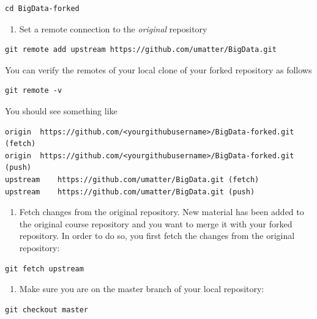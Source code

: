 \documentclass[
  12pt,
]{style/krantz}
\providecommand{\tightlist}{%
  \setlength{\itemsep}{0pt}\setlength{\parskip}{0pt}}
\begin{document}
\begin{verbatim}
cd BigData-forked
\end{verbatim}

\begin{enumerate}
\def\labelenumi{\arabic{enumi}.}
\setcounter{enumi}{3}
\tightlist
\item
  Set a remote connection to the \emph{original} repository
\end{enumerate}

\begin{verbatim}
git remote add upstream https://github.com/umatter/BigData.git
\end{verbatim}

You can verify the remotes of your local clone of your forked repository as follows

\begin{verbatim}
git remote -v
\end{verbatim}

You should see something like

\begin{verbatim}
origin  https://github.com/<yourgithubusername>/BigData-forked.git (fetch)
origin  https://github.com/<yourgithubusername>/BigData-forked.git (push)
upstream    https://github.com/umatter/BigData.git (fetch)
upstream    https://github.com/umatter/BigData.git (push)
\end{verbatim}

\begin{enumerate}
\def\labelenumi{\arabic{enumi}.}
\setcounter{enumi}{4}
\tightlist
\item
  Fetch changes from the original repository. New material has been added to the original course repository and you want to merge it with your forked repository. In order to do so, you first fetch the changes from the original repository:
\end{enumerate}

\begin{verbatim}
git fetch upstream
\end{verbatim}

\begin{enumerate}
\def\labelenumi{\arabic{enumi}.}
\setcounter{enumi}{5}
\tightlist
\item
  Make sure you are on the master branch of your local repository:
\end{enumerate}

\begin{verbatim}
git checkout master
\end{verbatim}
\end{document}
